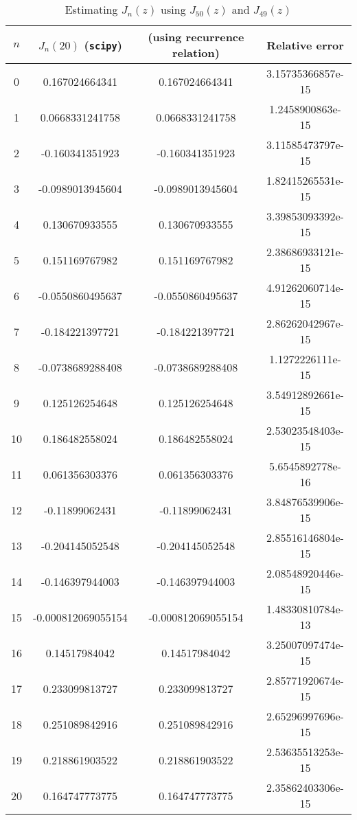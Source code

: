 \documentclass[10pt]{article}
\begin{document}
\begin{table}[H] 
\caption{Estimating $ J_{n}(z) $ using $ J_{50}(z) $ and $ J_{49}(z) $} %
\centering %
\begin{tabular}{c c c c} %
\hline\hline %
$n$ & $J_n(20)$ (\verb+scipy+) & (using recurrence relation) & Relative error \\ [0.5ex] %
\hline %
0 & 0.167024664341 & 0.167024664341 & 3.15735366857e-15 \\
1 & 0.0668331241758 & 0.0668331241758 & 1.2458900863e-15 \\
2 & -0.160341351923 & -0.160341351923 & 3.11585473797e-15 \\
3 & -0.0989013945604 & -0.0989013945604 & 1.82415265531e-15 \\
4 & 0.130670933555 & 0.130670933555 & 3.39853093392e-15 \\
5 & 0.151169767982 & 0.151169767982 & 2.38686933121e-15 \\
6 & -0.0550860495637 & -0.0550860495637 & 4.91262060714e-15 \\
7 & -0.184221397721 & -0.184221397721 & 2.86262042967e-15 \\
8 & -0.0738689288408 & -0.0738689288408 & 1.1272226111e-15 \\
9 & 0.125126254648 & 0.125126254648 & 3.54912892661e-15 \\
10 & 0.186482558024 & 0.186482558024 & 2.53023548403e-15 \\
11 & 0.061356303376 & 0.061356303376 & 5.6545892778e-16 \\
12 & -0.11899062431 & -0.11899062431 & 3.84876539906e-15 \\
13 & -0.204145052548 & -0.204145052548 & 2.85516146804e-15 \\
14 & -0.146397944003 & -0.146397944003 & 2.08548920446e-15 \\
15 & -0.000812069055154 & -0.000812069055154 & 1.48330810784e-13 \\
16 & 0.14517984042 & 0.14517984042 & 3.25007097474e-15 \\
17 & 0.233099813727 & 0.233099813727 & 2.85771920674e-15 \\
18 & 0.251089842916 & 0.251089842916 & 2.65296997696e-15 \\
19 & 0.218861903522 & 0.218861903522 & 2.53635513253e-15 \\
20 & 0.164747773775 & 0.164747773775 & 2.35862403306e-15 \\

\end{tabular}
\end{table}
\end{document}
